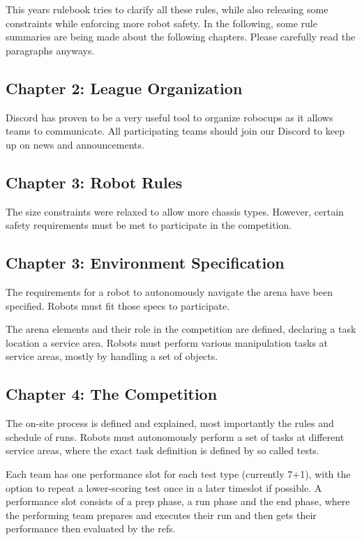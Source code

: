 This years rulebook tries to clarify all these rules, while also releasing some constraints 
while enforcing more robot safety. In the following, 
some rule summaries are being made about the following chapters.
Please carefully read the paragraphs anyways.

\subsection{Chapter 2: League Organization}

Discord has proven to be a very useful tool to organize 
robocups as it allows teams to communicate. All participating teams should join our Discord to keep up on news and announcements.

\subsection{Chapter 3: Robot Rules}

The size constraints were relaxed to allow more chassis types.
However, certain safety requirements must be met to participate in the competition.

\subsection{Chapter 3: Environment Specification}

The requirements for a robot to autonomously navigate the arena have been specified. Robots must fit those specs to participate.

The arena elements and their role in the competition are defined, declaring a task location a service area.
Robots must perform various manipulation tasks at service areas, mostly by handling a set of objects.



\subsection{Chapter 4: The Competition}

The on-site process is defined and explained, most importantly the rules and schedule of runs. Robots must autonomously perform a set of tasks at different service areas, where the exact task definition is defined by so called tests.

Each team has one performance slot for each test type (currently 7+1), with the option to repeat a lower-scoring test once in a later timeslot if possible.
A performance slot consists of a prep phase, a run phase and the end phase, where the performing team prepares and executes their run and then gets their performance then evaluated by the refs.

